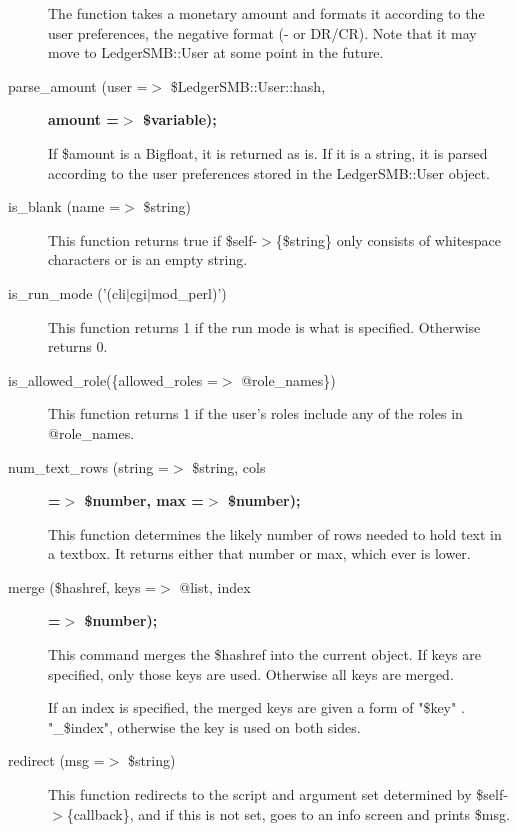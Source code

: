 \begin{description}
The function takes a monetary amount and formats it according to the user 
preferences, the negative format (- or DR/CR).  Note that it may move to
LedgerSMB::User at some point in the future.


\item[{parse\_amount (user =$>$ \$LedgerSMB::User::hash,}] \textbf{amount =$>$ \$variable);}

If \$amount is a Bigfloat, it is returned as is.  If it is a string, it is 
parsed according to the user preferences stored in the LedgerSMB::User object.


\item[{is\_blank (name =$>$ \$string)}] \mbox{}

This function returns true if \$self-$>$\{\$string\} only consists of whitespace
characters or is an empty string.


\item[{is\_run\_mode ('(cli$|$cgi$|$mod\_perl)')}] \mbox{}

This function returns 1 if the run mode is what is specified.  Otherwise
returns 0.


\item[{is\_allowed\_role(\{allowed\_roles =$>$ @role\_names\})}] \mbox{}

This function returns 1 if the user's roles include any of the roles in
@role\_names.


\item[{num\_text\_rows (string =$>$ \$string, cols}] \textbf{=$>$ \$number, max =$>$ \$number);}

This function determines the likely number of rows needed to hold text in a 
textbox.  It returns either that number or max, which ever is lower.


\item[{merge (\$hashref, keys =$>$ @list, index}] \textbf{=$>$ \$number);}

This command merges the \$hashref into the current object.  If keys are 
specified, only those keys are used.  Otherwise all keys are merged.



If an index is specified, the merged keys are given a form of 
"\$key" . "\_\$index", otherwise the key is used on both sides.


\item[{redirect (msg =$>$ \$string)}] \mbox{}

This function redirects to the script and argument set determined by 
\$self-$>$\{callback\}, and if this is not set, goes to an info screen and prints
\$msg.



\end{description}
